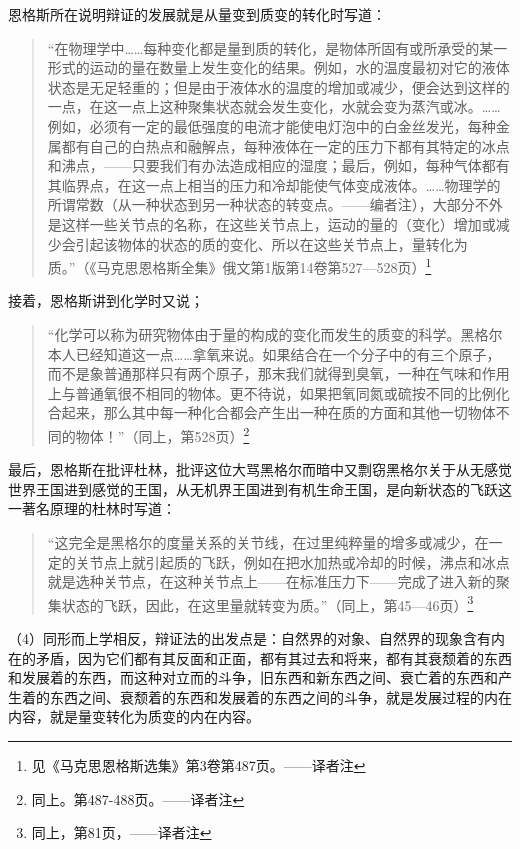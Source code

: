 恩格斯所在说明辩证的发展就是从量变到质变的转化时写道：

\begin{quotation}
“在物理学中……每种变化都是量到质的转化，是物体所固有或所承受的某一形式的运动的量在数量上发生变化的结果。例如，水的温度最初对它的液体状态是无足轻重的；但是由于液体水的温度的增加或减少，便会达到这样的一点，在这一点上这种聚集状态就会发生变化，水就会变为蒸汽或冰。……例如，必须有一定的最低强度的电流才能使电灯泡中的白金丝发光，每种金属都有自己的白热点和融解点，每种液体在一定的压力下都有其特定的冰点和沸点，——只要我们有办法造成相应的湿度；最后，例如，每种气体都有其临界点，在这一点上相当的压力和冷却能使气体变成液体。……物理学的所谓常数（从一种状态到另一种状态的转变点。——编者注），大部分不外是这样一些关节点的名称，在这些关节点上，运动的量的（变化）增加或减少会引起该物体的状态的质的变化、所以在这些关节点上，量转化为质。”（《马克思恩格斯全集》俄文第1版第14卷第527—528页）\footnote{见《马克思恩格斯选集》第3卷第487页。——译者注}
\end{quotation}

接着，恩格斯讲到化学时又说；

\begin{quotation}
“化学可以称为研究物体由于量的构成的变化而发生的质变的科学。黑格尔本人已经知道这一点……拿氧来说。如果结合在一个分子中的有三个原子，而不是象普通那样只有两个原子，那末我们就得到臭氧，一种在气味和作用上与普通氧很不相同的物体。更不待说，如果把氧同氮或硫按不同的比例化合起来，那么其中每一种化合都会产生出一种在质的方面和其他一切物体不同的物体！”（同上，第528页）\footnote{同上。第487-488页。——译者注}
\end{quotation}

最后，恩格斯在批评杜林，批评这位大骂黑格尔而暗中又剽窃黑格尔关于从无感觉世界王国进到感觉的王国，从无机界王国进到有机生命王国，是向新状态的飞跃这一著名原理的杜林时写道：

\begin{quotation}
“这完全是黑格尔的度量关系的关节线，在过里纯粹量的增多或减少，在一定的关节点上就引起质的飞跃，例如在把水加热或冷却的时候，沸点和冰点就是选种关节点，在这种关节点上——在标准压力下——完成了进入新的聚集状态的飞跃，因此，在这里量就转变为质。”（同上，第45—46页）\footnote{同上，第81页，——译者注}
\end{quotation}

（4）同形而上学相反，辩证法的出发点是：自然界的对象、自然界的现象含有内在的矛盾，因为它们都有其反面和正面，都有其过去和将来，都有其衰颓着的东西和发展着的东西，而这种对立而的斗争，旧东西和新东西之间、衰亡着的东西和产生着的东西之间、衰颓着的东西和发展着的东西之间的斗争，就是发展过程的内在内容，就是量变转化为质变的内在内容。

